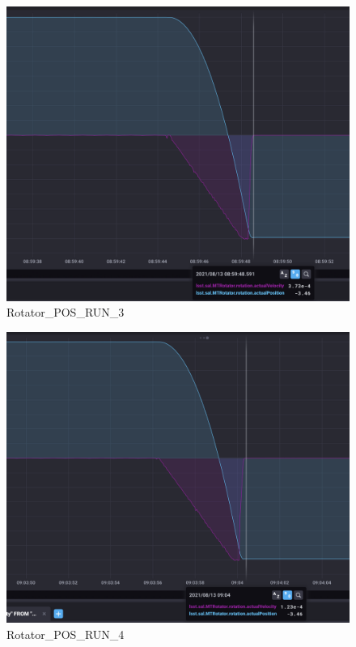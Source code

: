 \documentclass[SE,lsstdraft,authoryear,toc]{lsstdoc}
\begin{document}
\begin{figure}
  \includegraphics[width=\linewidth]{media/rotator_pos_3.png}
  \caption{Rotator\_POS\_RUN\_3}
  \label{fig:Rotator_POS_RUN_3}
\end{figure}

\begin{figure}
  \includegraphics[width=\linewidth]{media/rotator_pos_4.png}
  \caption{Rotator\_POS\_RUN\_4}
  \label{fig:Rotator_POS_RUN_4}
\end{figure}
\end{document}
